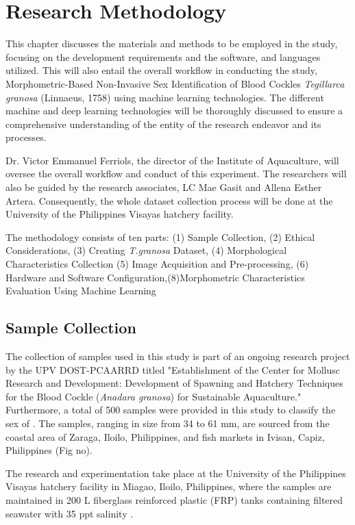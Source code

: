 \chapter{Research Methodology}
\label{sec:methodology}

This chapter discusses the materials and methods to be employed in the study, focusing on the development requirements and the software, and languages utilized. This will also entail the overall workflow in conducting the study, Morphometric-Based Non-Invasive Sex Identification of Blood Cockles \textit{Tegillarca granosa} (Linnaeus, 1758) using machine learning technologies. The different machine and deep learning technologies will be thoroughly discussed to ensure a comprehensive understanding of the entity of the research endeavor and its processes. 

Dr. Victor Emmanuel Ferriols, the director of the Institute of Aquaculture, will oversee the overall workflow and conduct of this experiment. The researchers will also be guided by the research associates, LC Mae Gasit and Allena Esther Artera. Consequently, the whole dataset collection process will be done at the University of the Philippines Visayas hatchery facility. 

The methodology consists of ten parts: (1) Sample Collection, (2) Ethical Considerations, (3) Creating \textit{T.granosa} Dataset, (4) Morphological Characteristics Collection (5) Image Acquisition and Pre-processing, (6) Hardware and Software Configuration,(8)Morphometric Characteristics Evaluation Using Machine Learning

\section{Sample Collection}
\label{sec:samplecollect}
The collection of \Tgranosa samples used in this study is part of an ongoing research project by the UPV DOST-PCAARRD titled "Establishment of the Center for Mollusc Research and Development: Development of Spawning and Hatchery Techniques for the Blood Cockle (\textit{Anadara granosa}) for Sustainable Aquaculture." Furthermore, a total of 500 samples were provided in this study to classify the sex of \Tgranosa.  The samples, ranging in size from 34 to 61 mm, are sourced from the coastal area of Zaraga, Iloilo, Philippines, and fish markets in Ivisan, Capiz, Philippines (Fig no). 

The research and experimentation take place at the University of the Philippines Visayas hatchery facility in Miagao, Iloilo, Philippines, where the samples are maintained in 200 L fiberglass reinforced plastic (FRP) tanks containing filtered seawater with 35 ppt salinity \cite{miranda2023}. 

